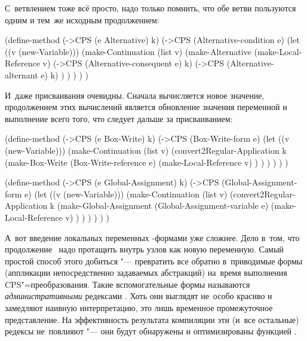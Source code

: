 С~ветвлением тоже всё просто, надо только помнить, что обе ветви пользуются
одним и тем~же исходным продолжением:

\begin{code:lisp}
(define-method (->CPS (e Alternative) k)
  (->CPS (Alternative-condition e)
         (let ((v (new-Variable)))
           (make-Continuation
            (list v) (make-Alternative
                      (make-Local-Reference v)
                      (->CPS (Alternative-consequent e) k)
                      (->CPS (Alternative-alternant e) k) ) ) ) ) )
\end{code:lisp}

И~даже присваивания очевидны. Сначала вычисляется новое значение, продолжением
этих вычислений является обновление значения переменной и выполнение всего того,
что следует дальше за присваиванием:

\begin{code:lisp}
(define-method (->CPS (e Box-Write) k)
  (->CPS (Box-Write-form e)
         (let ((v (new-Variable)))
           (make-Continuation
            (list v) (convert2Regular-Application
                      k (make-Box-Write
                         (Box-Write-reference e)
                         (make-Local-Reference v) ) ) ) ) ) )

(define-method (->CPS (e Global-Assignment) k)
  (->CPS (Global-Assignment-form e)
         (let ((v (new-Variable)))
           (make-Continuation
            (list v) (convert2Regular-Application
                      k (make-Global-Assignment
                         (Global-Assignment-variable e)
                         (make-Local-Reference v) ) ) ) ) ) )
\end{code:lisp}

А~вот введение локальных переменных -формами уже сложнее. Дело в~том,
что продолжение~ надо протащить внутрь узлов  как новую
переменную. Самый простой способ этого добиться "--- превратить все 
обратно в~приводимые формы (аппликации непосредственно задаваемых абстракций)
на~время выполнения CPS"=преобразования. Такие вспомогательные формы называются
\emph{административными} редексами \cite{sf92}. Хоть они выглядят не~особо
красиво и замедляют наивную интерпретацию, это лишь временное промежуточное
представление. На эффективность результата компиляции эти (и~все остальные)
редексы не~повлияют "--- они будут обнаружены и оптимизированы функцией
.

